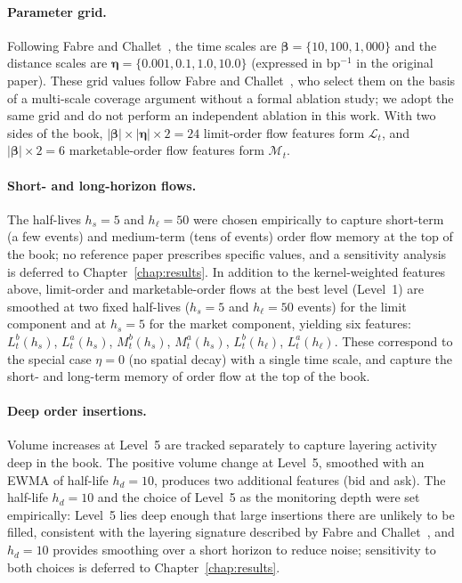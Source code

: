 \documentclass[11pt]{report}
\begin{document}
\paragraph{Parameter grid.}
Following Fabre and Challet~\cite{fabre_2025}, the time scales are $\boldsymbol{\beta} = \{10, 100, 1{,}000\}$ and the distance scales are $\boldsymbol{\eta} = \{0.001, 0.1, 1.0, 10.0\}$ (expressed in bp$^{-1}$ in the original paper). These grid values follow Fabre and Challet~\cite{fabre_2025}, who select them on the basis of a multi-scale coverage argument without a formal ablation study; we adopt the same grid and do not perform an independent ablation in this work. With two sides of the book, $|\boldsymbol{\beta}| \times |\boldsymbol{\eta}| \times 2 = 24$ limit-order flow features form $\mathcal{L}_t$, and $|\boldsymbol{\beta}| \times 2 = 6$ marketable-order flow features form $\mathcal{M}_t$.

\paragraph{Short- and long-horizon flows.}
The half-lives $h_s = 5$ and $h_\ell = 50$ were chosen empirically to capture short-term (a few events) and medium-term (tens of events) order flow memory at the top of the book; no reference paper prescribes specific values, and a sensitivity analysis is deferred to Chapter~\ref{chap:results}. In addition to the kernel-weighted features above, limit-order and marketable-order flows at the best level (Level~1) are smoothed at two fixed half-lives ($h_s = 5$ and $h_\ell = 50$ events) for the limit component and at $h_s = 5$ for the market component, yielding six features: $L^b_t(h_s)$, $L^a_t(h_s)$, $M^b_t(h_s)$, $M^a_t(h_s)$, $L^b_t(h_\ell)$, $L^a_t(h_\ell)$. These correspond to the special case $\eta = 0$ (no spatial decay) with a single time scale, and capture the short- and long-term memory of order flow at the top of the book.

\paragraph{Deep order insertions.}
Volume increases at Level~5 are tracked separately to capture layering activity deep in the book. The positive volume change at Level~5, smoothed with an EWMA of half-life $h_d = 10$, produces two additional features (bid and ask). The half-life $h_d = 10$ and the choice of Level~5 as the monitoring depth were set empirically: Level~5 lies deep enough that large insertions there are unlikely to be filled, consistent with the layering signature described by Fabre and Challet~\cite{fabre_2025}, and $h_d = 10$ provides smoothing over a short horizon to reduce noise; sensitivity to both choices is deferred to Chapter~\ref{chap:results}.
\end{document}
